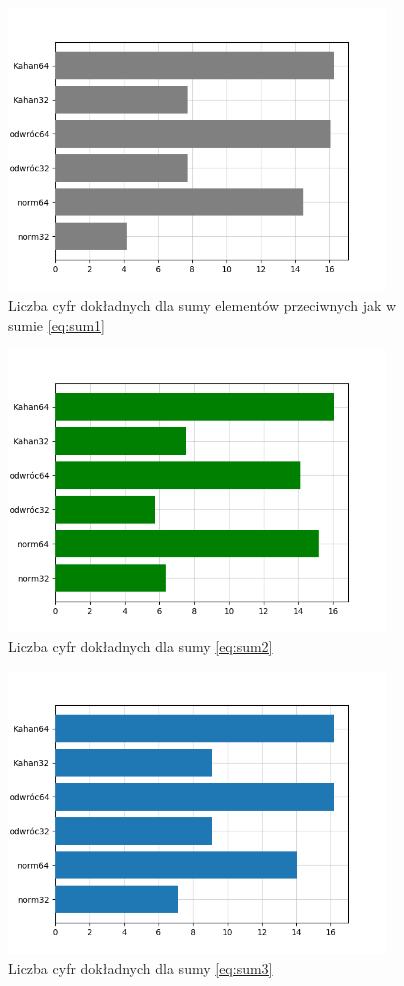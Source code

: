 \documentclass[11pt]{article}
\begin{document}
\begin{figure}[!htbp]
  \includegraphics[width=10cm]{figura4.png}
  \centering
  \caption{Liczba cyfr dokładnych dla sumy elementów przeciwnych jak w sumie \ref{eq:sum1}}
  \label{fig:wykres4}
\end{figure}

\begin{figure}[!htbp]
  \includegraphics[width=10cm]{figura2.png}
  \centering
  \caption{Liczba cyfr dokładnych dla sumy \ref{eq:sum2}}
  \label{fig:wykres2}
\end{figure}

\begin{figure}[!htbp]
  \includegraphics[width=10cm]{figura3.png}
  \centering
  \caption{Liczba cyfr dokładnych dla sumy \ref{eq:sum3}}
  \label{fig:wykres3}
\end{figure}
\end{document}
